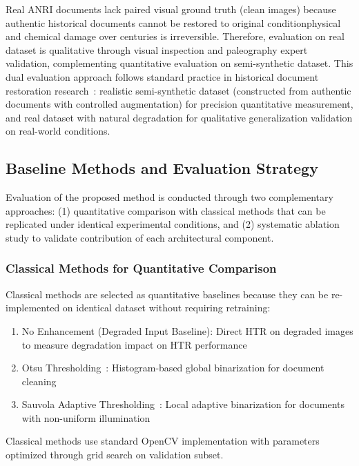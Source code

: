 \documentclass[journal]{IEEEtran}
\begin{document}
Real ANRI documents lack paired visual ground truth (clean images) because authentic historical documents cannot be restored to original condition\textemdash physical and chemical damage over centuries is irreversible. Therefore, evaluation on real dataset is qualitative through visual inspection and paleography expert validation, complementing quantitative evaluation on semi-synthetic dataset. This dual evaluation approach follows standard practice in historical document restoration research~\cite{souibgui2021enhance,souibgui2020degan}: realistic semi-synthetic dataset (constructed from authentic documents with controlled augmentation) for precision quantitative measurement, and real dataset with natural degradation for qualitative generalization validation on real-world conditions.

\subsection{Baseline Methods and Evaluation Strategy}

Evaluation of the proposed method is conducted through two complementary approaches: (1) quantitative comparison with classical methods that can be replicated under identical experimental conditions, and (2) systematic ablation study to validate contribution of each architectural component.

\subsubsection{Classical Methods for Quantitative Comparison}

Classical methods are selected as quantitative baselines because they can be re-implemented on identical dataset without requiring retraining:

\begin{enumerate}
    \item No Enhancement (Degraded Input Baseline): Direct HTR on degraded images to measure degradation impact on HTR performance
    \item Otsu Thresholding~\cite{otsu1979threshold}: Histogram-based global binarization for document cleaning
    \item Sauvola Adaptive Thresholding~\cite{sauvola2000adaptive}: Local adaptive binarization for documents with non-uniform illumination
\end{enumerate}

Classical methods use standard OpenCV implementation with parameters optimized through grid search on validation subset.
\end{document}
